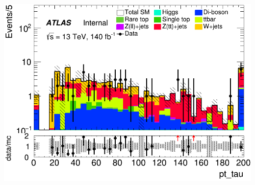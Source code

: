 \documentclass[usenames,dvipsnames]{beamer}
\begin{document}
\begin{frame}
\begin{minipage}{0.32\textwidth}
        \includegraphics[width=\textwidth]{graphics/HHH_met/HHH_met_pt_tau.png}
    \end{minipage}
    
    \vspace{0.5cm} %
\end{frame}
\end{document}
